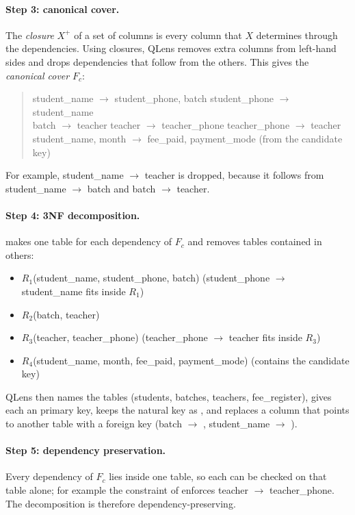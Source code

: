 \paragraph{Step 3: canonical cover.} The \emph{closure} $X^{+}$ of a set of columns is every column that
$X$ determines through the dependencies. Using closures, QLens removes extra columns from left-hand sides
and drops dependencies that follow from the others. This gives the \emph{canonical cover} $F_c$:
\begin{quote}\small
student\_name $\rightarrow$ student\_phone, batch \qquad student\_phone $\rightarrow$ student\_name\\
batch $\rightarrow$ teacher \qquad teacher $\rightarrow$ teacher\_phone \qquad teacher\_phone $\rightarrow$ teacher\\
student\_name, month $\rightarrow$ fee\_paid, payment\_mode \quad (from the candidate key)
\end{quote}
For example, student\_name $\rightarrow$ teacher is dropped, because it follows from student\_name
$\rightarrow$ batch and batch $\rightarrow$ teacher.

\paragraph{Step 4: 3NF decomposition.}  makes one table for each dependency of $F_c$
and removes tables contained in others:
\begin{itemize}
  \item $R_1$(student\_name, student\_phone, batch) \quad (student\_phone $\rightarrow$ student\_name fits inside $R_1$)
  \item $R_2$(batch, teacher)
  \item $R_3$(teacher, teacher\_phone) \quad (teacher\_phone $\rightarrow$ teacher fits inside $R_3$)
  \item $R_4$(student\_name, month, fee\_paid, payment\_mode) \quad (contains the candidate key)
\end{itemize}
QLens then names the tables (students, batches, teachers, fee\_register), gives each an  primary
key, keeps the natural key as , and replaces a column that points to another table with a
foreign key (batch $\rightarrow$ , student\_name $\rightarrow$ ).


\paragraph{Step 5: dependency preservation.} Every dependency of $F_c$ lies inside one table, so each can
be checked on that table alone; for example the  constraint of 
enforces teacher $\rightarrow$ teacher\_phone. The decomposition is therefore dependency-preserving.

